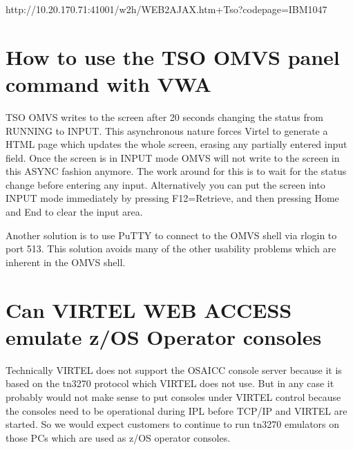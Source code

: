 \documentclass[letterpaper,10pt,english]{sphinxmanual}
\begin{document}
\begin{sphinxVerbatim}[commandchars=\\\{\}]
http://10.20.170.71:41001/w2h/WEB2AJAX.htm+Tso?codepage=IBM1047
\end{sphinxVerbatim}

\ignorespaces 

\section{How to use the TSO OMVS panel command with VWA}
\label{\detokenize{Customization:how-to-use-the-tso-omvs-panel-command-with-vwa}}\label{\detokenize{Customization:index-128}}
\sphinxAtStartPar
TSO OMVS writes to the screen after 20 seconds changing the status from RUNNING to INPUT. This asynchronous nature forces Virtel to generate a HTML page which updates the whole screen, erasing any partially entered input field. Once the screen is in INPUT mode OMVS will not write to the screen in this ASYNC fashion anymore. The work around for this is to wait for the status change before entering any input. Alternatively you can put the screen into INPUT mode immediately by pressing F12=Retrieve, and then pressing Home and End to clear the input area.

\sphinxAtStartPar
Another solution is to use PuTTY to connect to the OMVS shell via rlogin to port 513. This solution avoids many of the other usability problems which are inherent in the OMVS shell.

\ignorespaces 

\section{Can VIRTEL WEB ACCESS emulate z/OS Operator consoles}
\label{\detokenize{Customization:can-virtel-web-access-emulate-z-os-operator-consoles}}\label{\detokenize{Customization:index-129}}
\sphinxAtStartPar
Technically VIRTEL does not support the OSA\sphinxhyphen{}ICC console server because it is based on the tn3270 protocol which VIRTEL does not use. But in any case it probably would not make sense to put consoles under VIRTEL control because the consoles need to be operational during IPL before TCP/IP and VIRTEL are started. So we would expect customers to continue to run tn3270 emulators on those PCs which are used as z/OS operator consoles.
\end{document}
